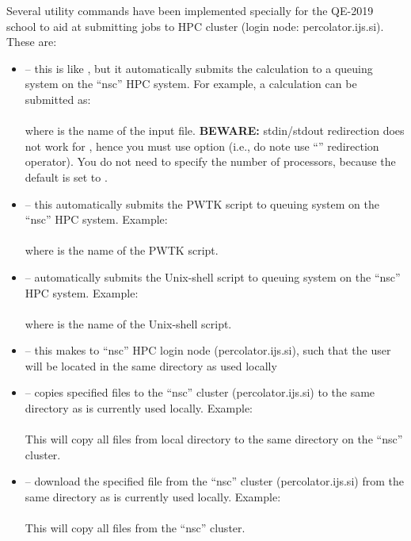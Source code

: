 \documentclass[landscape]{foils}
\begin{document}
Several utility commands have been implemented specially for the
QE-2019 school to aid at submitting jobs to HPC cluster (login node:
percolator.ijs.si). These are: {\small
\begin{itemize}
\item {} -- this is like , but it
  automatically submits the calculation to a queuing system on the
  ``nsc'' HPC system. For example, a  calculation can be
  submitted
  as:\\[0.5em]
  \\[0.5em]
  where  is the name of the  input
  file. {\bf BEWARE:} stdin/stdout redirection does not work for
  , hence you must use  option (i.e.,
  do note use ``\cmd{<}'' redirection operator). You do not need to
  specify the number of processors, because the default is set to
  .
  \vspace{0.5em}
\item {} -- this automatically submits the PWTK
  script to queuing system on the ``nsc'' HPC system. Example:\\[0.5em]
  \\[0.5em]
  where  is the name of the PWTK script.
\vspace{0.5em}
\item {} -- automatically submits the Unix-shell
  script to queuing system on the ``nsc''  HPC system. Example:\\[0.5em]
  \\[0.5em]
  where  is the name of the Unix-shell script.

\clearpage
\item {} -- this makes  to ``nsc'' HPC login node
  (percolator.ijs.si), such that the user will be located in the same
  directory as used locally
\vspace{0.5em}
\item {} -- copies specified files to the ``nsc''
  cluster (percolator.ijs.si) to the same directory as is currently
  used locally. Example:\\[0.5em]
  \\[0.5em]
  This will copy all  files from local directory to the
  same directory on the ``nsc'' cluster.
\vspace{0.5em}  
\item {} -- download the specified file from the
  ``nsc'' cluster (percolator.ijs.si) from the same directory as is
  currently used locally. Example:\\[0.5em]
  \\[0.5em]
  This will copy all  files from the ``nsc'' cluster.
\end{itemize}
}
\rightheader{}
\end{document}
